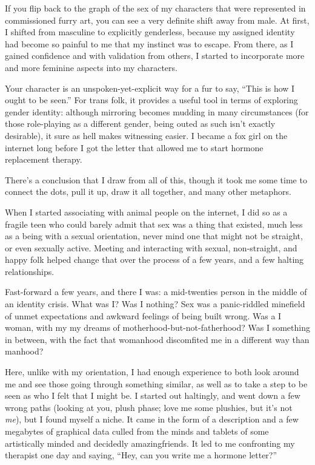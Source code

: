 If you flip back to the graph of the sex of my characters that were represented in commissioned furry art, you can see a very definite shift away from male. At first, I shifted from masculine to explicitly genderless, because my assigned identity had become so painful to me that my instinct was to escape. From there, as I gained confidence and with validation from others, I started to incorporate more and more feminine aspects into my characters.

Your character is an unspoken-yet-explicit way for a fur to say, ``This is how I ought to be seen.''  For trans folk, it provides a useful tool in terms of exploring gender identity: although mirroring becomes mudding in many circumstances (for those role-playing as a different gender, being outed as such isn't exactly desirable), it sure as hell makes witnessing easier. I became a fox girl on the internet long before I got the letter that allowed me to start hormone replacement therapy.

There's a conclusion that I draw from all of this, though it took me some time to connect the dots, pull it up, draw it all together, and many other metaphors.

When I started associating with animal people on the internet, I did so as a fragile teen who could barely admit that sex was a thing that existed, much less as a being with a sexual orientation, never mind one that might not be straight, or even sexually active. Meeting and interacting with sexual, non-straight, and happy folk helped change that over the process of a few years, and a few halting relationships.

Fast-forward a few years, and there I was: a mid-twenties person in the middle of an identity crisis. What was I?  Was I nothing?  Sex was a panic-riddled minefield of unmet expectations and awkward feelings of being built wrong. Was a I woman, with my my dreams of motherhood-but-not-fatherhood?  Was I something in between, with the fact that womanhood discomfited me in a different way than manhood?

Here, unlike with my orientation, I had enough experience to both look around me and see those going through something similar, as well as to take a step to be seen as who I felt that I might be. I started out haltingly, and went down a few wrong paths (looking at you, plush phase; love me some plushies, but it's not \textit{me}), but I found myself a niche. It came in the form of a description and a few megabytes of graphical data culled from the minds and tablets of some artistically minded and decidedly amazingfriends. It led to me confronting my therapist one day and saying, ``Hey, can you write me a hormone letter?''

